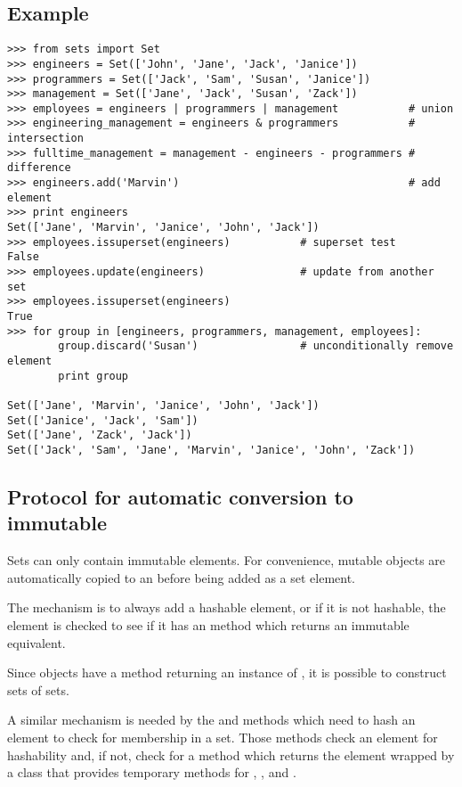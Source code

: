 \subsection{Example}

\begin{verbatim}
>>> from sets import Set
>>> engineers = Set(['John', 'Jane', 'Jack', 'Janice'])
>>> programmers = Set(['Jack', 'Sam', 'Susan', 'Janice'])
>>> management = Set(['Jane', 'Jack', 'Susan', 'Zack'])
>>> employees = engineers | programmers | management           # union
>>> engineering_management = engineers & programmers           # intersection
>>> fulltime_management = management - engineers - programmers # difference
>>> engineers.add('Marvin')                                    # add element
>>> print engineers
Set(['Jane', 'Marvin', 'Janice', 'John', 'Jack'])
>>> employees.issuperset(engineers)           # superset test
False
>>> employees.update(engineers)               # update from another set
>>> employees.issuperset(engineers)
True
>>> for group in [engineers, programmers, management, employees]:
        group.discard('Susan')                # unconditionally remove element
        print group

Set(['Jane', 'Marvin', 'Janice', 'John', 'Jack'])
Set(['Janice', 'Jack', 'Sam'])
Set(['Jane', 'Zack', 'Jack'])
Set(['Jack', 'Sam', 'Jane', 'Marvin', 'Janice', 'John', 'Zack'])
\end{verbatim}


\subsection{Protocol for automatic conversion to immutable
            \label{immutable-transforms}}

Sets can only contain immutable elements.  For convenience, mutable
 objects are automatically copied to an 
before being added as a set element.

The mechanism is to always add a hashable element, or if it is not hashable,
the element is checked to see if it has an  method
which returns an immutable equivalent.

Since  objects have a  method
returning an instance of , it is possible to
construct sets of sets.

A similar mechanism is needed by the  and
 methods which need to hash an element to check
for membership in a set.  Those methods check an element for hashability
and, if not, check for a  method
which returns the element wrapped by a class that provides temporary
methods for , , and .

